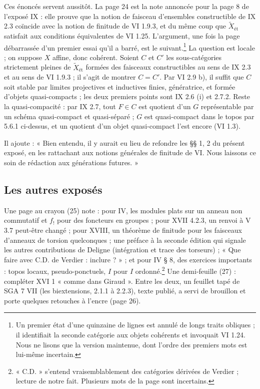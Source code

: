 \documentclass[11pt,a4paper]{article}
\begin{document}
Ces énoncés servent aussitôt. La page 24 est la note annoncée pour la page 8
de l'exposé IX : elle prouve que la notion de faisceau d'ensembles
constructible de IX 2.3 coïncide avec la notion de finitude de VI 1.9.3, et
du même coup que $\widetilde{X}_{\text{ét}}$ satisfait aux conditions
équivalentes de VI 1.25. L'argument, une fois la page débarrassée d'un
premier essai qu'il a barré, est le suivant.\footnote{Un premier état d'une
quinzaine de lignes est annulé de longs traits obliques ; il identifiait la
seconde catégorie aux objets cohérents et invoquait VI 1.24. Nous ne lisons
que la version maintenue, dont l'ordre des premiers mots est lui-même
incertain.}
La question est locale ; on suppose $X$ affine, donc cohérent. Soient $C$ et
$C'$ les sous-catégories strictement pleines de $\widetilde{X}_{\text{ét}}$
formées des faisceaux constructibles au sens de IX 2.3 et au sens de VI 1.9.3 ;
il s'agit de montrer $C = C'$. Par VI 2.9 b), il suffit que $C$ soit stable
par limites projectives et inductives finies, génératrice, et formée d'objets
quasi-compacts ; les deux premiers points sont IX 2.6 (i) et 2.7.2. Reste la
quasi-compacité : par IX 2.7, tout $F \in C$ est quotient d'un $G$
représentable par un schéma quasi-compact et quasi-séparé ; $G$ est
quasi-compact dans le topos par 5.6.1 ci-dessus, et un quotient d'un objet
quasi-compact l'est encore (VI 1.3).

Il ajoute : « Bien entendu, il y aurait eu lieu de refondre les §§ 1, 2 du
présent exposé, en les rattachant aux notions générales de finitude de VI.
Nous laissons ce soin de rédaction aux générations futures. »

\subsection*{Les autres exposés}

Une page au crayon (25) note : pour IV, les modules plats sur un anneau non
commutatif et $f_{!}$ pour des foncteurs en groupes ; pour XVII 4.2.3, un
renvoi à V 3.7 peut-être changé ; pour XVIII, un théorème de finitude pour les
faisceaux d'anneaux de torsion quelconques ; une préface à la seconde édition
qui signale les autres contributions de Deligne (intégration et trace des
torseurs) ; « Que faire avec C.D. de Verdier : inclure ? » ; et pour IV § 8,
des exercices importants : topos locaux, pseudo-ponctuels,
$\widehat{I}$ pour $I$ ordonné.\footnote{« C.D. » s'entend vraisemblablement
des catégories dérivées de Verdier ; lecture de notre fait. Plusieurs mots de
la page sont incertains.}
Une demi-feuille (27) : compléter XVI 1 « comme dans Giraud ». Entre les
deux, un feuillet tapé de SGA 7 VII (les biextensions, 2.1.1 à 2.2.3), texte
publié, a servi de brouillon et porte quelques retouches à l'encre (page
26).
\end{document}
